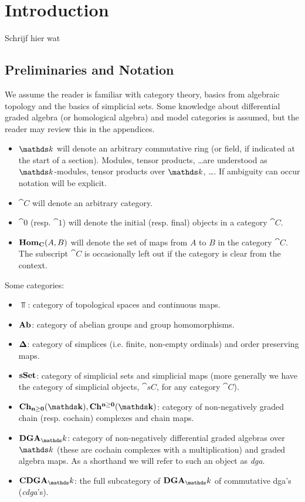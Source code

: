 
\chapter*{Introduction}

Schrijf hier wat

\section{Preliminaries and Notation}

We assume the reader is familiar with category theory, basics from algebraic topology and the basics of simplicial sets. Some knowledge about differential graded algebra (or homological algebra) and model categories is assumed, but the reader may review this in the appendices.

\begin{itemize}
	\item $\k$ will denote an arbitrary commutative ring (or field, if indicated at the start of a section). Modules, tensor products, \dots are understood as $\k$-modules, tensor products over $\k$, \dots. If ambiguity can occur notation will be explicit.
	\item $\cat{C}$ will denote an arbitrary category.
	\item $\cat{0}$ (resp. $\cat{1}$) will denote the initial (resp. final) objects in a category $\cat{C}$.
	\item $\mathbf{Hom}_{\mathbf{C}}(A, B)$ will denote the set of maps from $A$ to $B$ in the category $\cat{C}$. The subscript $\cat{C}$ is occasionally left out if the category is clear from the context.
\end{itemize}

Some categories:
\begin{itemize}
	\item $\Top$: category of topological spaces and continuous maps.
	\item $\mathbf{Ab}$: category of abelian groups and group homomorphisms.
	\item $\boldsymbol{\Delta}$: category of simplices (i.e. finite, non-empty ordinals) and order preserving maps.
	\item $\mathbf{s{\mathbf{Set}}}$: category of simplicial sets and simplicial maps (more generally we have the category of simplicial objects, $\cat{sC}$, for any category $\cat{C}$).
	\item $\Ch{\k}, \CoCh{\k}$: category of non-negatively graded chain (resp. cochain) complexes and chain maps.
	\item $\DGA_\k$: category of non-negatively differential graded algebras over $\k$ (these are cochain complexes with a multiplication) and graded algebra  maps. As a shorthand we will refer to such an object as \emph{dga}.
	\item $\CDGA_\k$: the full subcategory of $\DGA_\k$ of commutative dga's (\emph{cdga}'s).
\end{itemize}

\tableofcontents
{}
